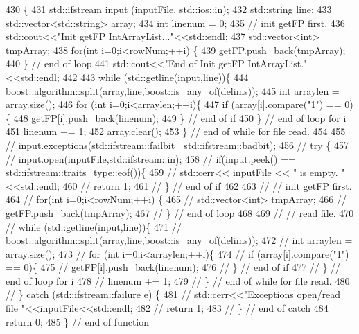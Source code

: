 \begin{DoxyCode}
430                                                    \{
431     std::ifstream input (inputFile, std::ios::in);
432     std::string line;
433     std::vector<std::string> array;
434     \textcolor{keywordtype}{int} linenum = 0;
435     \textcolor{comment}{// init getFP first.}
436     std::cout<<\textcolor{stringliteral}{"Init getFP IntArrayList..."}<<std::endl;
437     std::vector<int> tmpArray;
438     \textcolor{keywordflow}{for}(\textcolor{keywordtype}{int} i=0;i<rowNum;++i) \{
439       getFP.push\_back(tmpArray);
440     \} \textcolor{comment}{// end of loop}
441     std::cout<<\textcolor{stringliteral}{"End of Init getFP IntArrayList."}<<std::endl;
442 
443     \textcolor{keywordflow}{while} (std::getline(input,line))\{
444       boost::algorithm::split(array,line,boost::is\_any\_of(delims));
445       \textcolor{keywordtype}{int} arraylen = array.size();
446       \textcolor{keywordflow}{for} (\textcolor{keywordtype}{int} i=0;i<arraylen;++i)\{
447         \textcolor{keywordflow}{if} (array[i].compare(\textcolor{stringliteral}{"1"}) == 0)\{
448           getFP[i].push\_back(linenum);
449         \} \textcolor{comment}{// end of if}
450       \} \textcolor{comment}{// end of loop for i}
451       linenum += 1;
452       array.clear();
453     \} \textcolor{comment}{// end of while for file read.}
454 
455     \textcolor{comment}{// input.exceptions(std::ifstream::failbit | std::ifstream::badbit);}
456     \textcolor{comment}{// try \{}
457     \textcolor{comment}{//   input.open(inputFile,std::ifstream::in);}
458     \textcolor{comment}{//   if(input.peek() == std::ifstream::traits\_type::eof())\{}
459     \textcolor{comment}{//     std::cerr<< inputFile << " is empty. "<<std::endl;}
460     \textcolor{comment}{//     return 1;}
461     \textcolor{comment}{//   \} // end of if}
462 
463     \textcolor{comment}{//   // init getFP first.}
464     \textcolor{comment}{//   for(int i=0;i<rowNum;++i) \{}
465     \textcolor{comment}{//     std::vector<int> tmpArray;}
466     \textcolor{comment}{//     getFP.push\_back(tmpArray);}
467     \textcolor{comment}{//   \} // end of loop}
468 
469     \textcolor{comment}{//   // read file.}
470     \textcolor{comment}{//   while (std::getline(input,line))\{}
471     \textcolor{comment}{//     boost::algorithm::split(array,line,boost::is\_any\_of(delims));}
472     \textcolor{comment}{//     int arraylen = array.size();}
473     \textcolor{comment}{//     for (int i=0;i<arraylen;++i)\{}
474     \textcolor{comment}{//       if (array[i].compare("1") == 0)\{}
475     \textcolor{comment}{//         getFP[i].push\_back(linenum);}
476     \textcolor{comment}{//       \} // end of if}
477     \textcolor{comment}{//     \} // end of loop for i}
478     \textcolor{comment}{//     linenum += 1;}
479     \textcolor{comment}{//   \} // end of while for file read.}
480     \textcolor{comment}{// \} catch (std::ifstream::failure e) \{}
481     \textcolor{comment}{//   std::cerr<<"Exceptions open/read file "<<inputFile<<std::endl;}
482     \textcolor{comment}{//   return 1;}
483     \textcolor{comment}{// \} // end of catch}
484     \textcolor{keywordflow}{return} 0;
485   \} \textcolor{comment}{// end of function}
\end{DoxyCode}
